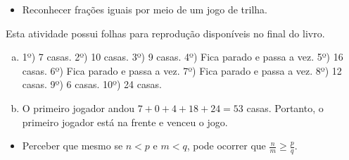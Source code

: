 %

\begin{objetivos}[label=chap4-ativ20]{}{}

 
\begin{itemize} %
    \item       Reconhecer frações iguais por meio de um jogo de trilha.
\end{itemize} %
\end{objetivos}

\begin{orientacoes}
  Esta atividade possui folhas para reprodução disponíveis no final do
livro.
\end{orientacoes}



\newpage
\begin{solucao}{}{}
\begin{enumerate}[a)]
\item 1º) 7 casas. 2º) 10 casas. 3º) 9 casas. 4º) Fica parado e passa a vez. 5º) 16 casas. 6º) Fica parado e passa a vez. 7º) Fica parado e passa a vez. 8º) 12 casas. 9º) 6 casas.
10º) 24 casas.

\item O primeiro jogador andou $7 + 0 + 4 + 18 + 24 = 53$ casas. Portanto, o primeiro jogador está na frente e venceu o jogo.
\end{enumerate}
\end{solucao}


\begin{objetivos}[label=chap4-ativ21]{}{}
\begin{itemize} %
    \item       Perceber que mesmo se       $n < p$       e       $m < q$, pode
ocorrer que       $\frac{n}{m} \geq \frac{p}{q}$.
\end{itemize} %
\end{objetivos}

